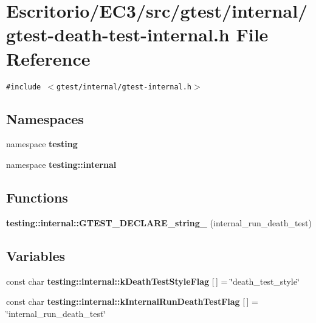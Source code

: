 \section{Escritorio/EC3/src/gtest/internal/gtest-death-test-internal.h File Reference}
\label{gtest-death-test-internal_8h}
{\tt \#include $<$gtest/internal/gtest-internal.h$>$}\par
\subsection*{Namespaces}
\begin{CompactItemize}
\item 
namespace {\bf testing}
\item 
namespace {\bf testing::internal}
\end{CompactItemize}
\subsection*{Functions}
\begin{CompactItemize}
\item 
{\bf testing::internal::GTEST\_\-DECLARE\_\-string\_\-} (internal\_\-run\_\-death\_\-test)
\end{CompactItemize}
\subsection*{Variables}
\begin{CompactItemize}
\item 
const char {\bf testing::internal::kDeathTestStyleFlag} [$\,$] = \char`\"{}death\_\-test\_\-style\char`\"{}
\item 
const char {\bf testing::internal::kInternalRunDeathTestFlag} [$\,$] = \char`\"{}internal\_\-run\_\-death\_\-test\char`\"{}
\end{CompactItemize}
